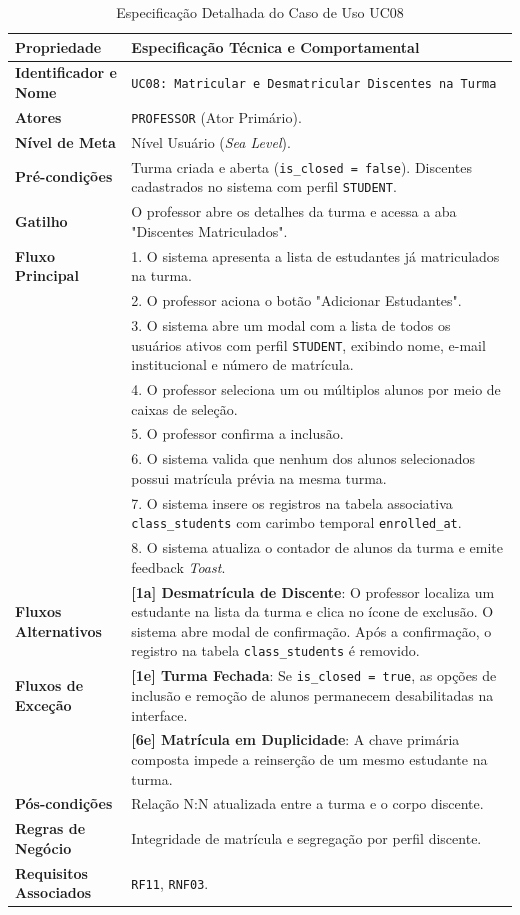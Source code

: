 \begin{table}[!ht]
\centering
\caption{Especificação Detalhada do Caso de Uso UC08}
\label{tab_uc08}
\footnotesize
\begin{tabularx}{\textwidth}{p{3.5cm} X}
\toprule
\textbf{Propriedade} & \textbf{Especificação Técnica e Comportamental} \\
\midrule
\textbf{Identificador e Nome} & \texttt{UC08: Matricular e Desmatricular Discentes na Turma} \\
\textbf{Atores} & \texttt{PROFESSOR} (Ator Primário). \\
\textbf{Nível de Meta} & Nível Usuário (\textit{Sea Level}). \\
\textbf{Pré-condições} & Turma criada e aberta (\texttt{is\_closed = false}). Discentes cadastrados no sistema com perfil \texttt{STUDENT}. \\
\textbf{Gatilho} & O professor abre os detalhes da turma e acessa a aba "Discentes Matriculados". \\
\textbf{Fluxo Principal} & 
1. O sistema apresenta a lista de estudantes já matriculados na turma.\\
& 2. O professor aciona o botão "Adicionar Estudantes".\\
& 3. O sistema abre um modal com a lista de todos os usuários ativos com perfil \texttt{STUDENT}, exibindo nome, e-mail institucional e número de matrícula.\\
& 4. O professor seleciona um ou múltiplos alunos por meio de caixas de seleção.\\
& 5. O professor confirma a inclusão.\\
& 6. O sistema valida que nenhum dos alunos selecionados possui matrícula prévia na mesma turma.\\
& 7. O sistema insere os registros na tabela associativa \texttt{class\_students} com carimbo temporal \texttt{enrolled\_at}.\\
& 8. O sistema atualiza o contador de alunos da turma e emite feedback \textit{Toast}. \\
\textbf{Fluxos Alternativos} & 
\textbf{[1a] Desmatrícula de Discente}: O professor localiza um estudante na lista da turma e clica no ícone de exclusão. O sistema abre modal de confirmação. Após a confirmação, o registro na tabela \texttt{class\_students} é removido. \\
\textbf{Fluxos de Exceção} & 
\textbf{[1e] Turma Fechada}: Se \texttt{is\_closed = true}, as opções de inclusão e remoção de alunos permanecem desabilitadas na interface.\\
& \textbf{[6e] Matrícula em Duplicidade}: A chave primária composta impede a reinserção de um mesmo estudante na turma. \\
\textbf{Pós-condições} & Relação N:N atualizada entre a turma e o corpo discente. \\
\textbf{Regras de Negócio} & Integridade de matrícula e segregação por perfil discente. \\
\textbf{Requisitos Associados} & \texttt{RF11}, \texttt{RNF03}. \\
\bottomrule
\end{tabularx}
\end{table}

